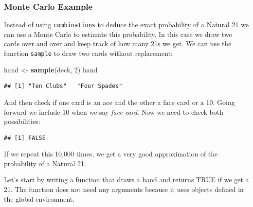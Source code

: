 \documentclass[
  openany]{book}
\newenvironment{Shaded}{\begin{snugshade}}{\end{snugshade}}
\newcommand{\DecValTok}[1]{\textcolor[rgb]{0.00,0.00,0.81}{#1}}
\newcommand{\KeywordTok}[1]{\textcolor[rgb]{0.13,0.29,0.53}{\textbf{#1}}}
\newcommand{\NormalTok}[1]{#1}
\newcommand{\OperatorTok}[1]{\textcolor[rgb]{0.81,0.36,0.00}{\textbf{#1}}}
\newcommand{\StringTok}[1]{\textcolor[rgb]{0.31,0.60,0.02}{#1}}
\begin{document}
\hypertarget{monte-carlo-example}{%
\subsubsection{Monte Carlo Example}\label{monte-carlo-example}}

Instead of using \texttt{combinations} to deduce the exact probability of a Natural 21 we can use a Monte Carlo to estimate this probability. In this case we draw two cards over and over and keep track of how many 21s we get. We can use the function \texttt{sample} to draw two cards without replacement:

\begin{Shaded}
\begin{Highlighting}[]
\NormalTok{hand <-}\StringTok{ }\KeywordTok{sample}\NormalTok{(deck, }\DecValTok{2}\NormalTok{)}
\NormalTok{hand}
\end{Highlighting}
\end{Shaded}

\begin{verbatim}
## [1] "Ten Clubs"   "Four Spades"
\end{verbatim}

And then check if one card is an ace and the other a face card or a 10. Going forward we include 10 when we say \emph{face card}. Now we need to check both possibilities:

\begin{Shaded}
\end{Shaded}

\begin{verbatim}
## [1] FALSE
\end{verbatim}

If we repeat this 10,000 times, we get a very good approximation of the probability of a Natural 21.

Let's start by writing a function that draws a hand and returns TRUE if we get a 21. The function does not need any
arguments because it uses objects defined in the global environment.
\end{document}
